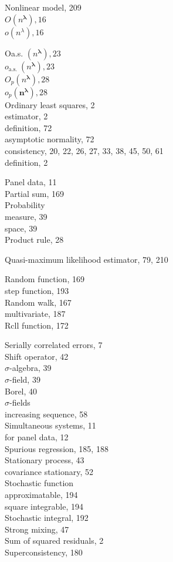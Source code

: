 \documentclass[10pt]{article}
\begin{document}
Nonlinear model, 209\\
$O\left(n^{\boldsymbol{\lambda}}\right), 16$\\
$o\left(n^{\lambda}\right), 16$

Oa.s. $\left(n^{\boldsymbol{\lambda}}\right), 23$\\
$o_{\text {a.s. }}\left(n^{\boldsymbol{\lambda}}\right), 23$\\
$O_{p}\left(n^{\boldsymbol{\lambda}}\right), 28$\\
$o_{p}\left(\boldsymbol{n}^{\boldsymbol{\lambda}}\right), 28$\\
Ordinary least squares, 2\\
estimator, 2\\
definition, 72\\
asymptotic normality, 72\\
consistency, 20, 22, 26, 27, 33, 38, 45, 50, 61\\
definition, 2

Panel data, 11\\
Partial sum, 169\\
Probability\\
measure, 39\\
space, 39\\
Product rule, 28

Quasi-maximum likelihood estimator, 79, 210

Random function, 169\\
step function, 193\\
Random walk, 167\\
multivariate, 187\\
Rcll function, 172

Serially correlated errors, 7\\
Shift operator, 42\\
$\sigma$-algebra, 39\\
$\sigma$-field, 39\\
Borel, 40\\
$\sigma$-fields\\
increasing sequence, 58\\
Simultaneous systems, 11\\
for panel data, 12\\
Spurious regression, 185, 188\\
Stationary process, 43\\
covariance stationary, 52\\
Stochastic function\\
approximatable, 194\\
square integrable, 194\\
Stochastic integral, 192\\
Strong mixing, 47\\
Sum of squared residuals, 2\\
Superconsistency, 180
\end{document}
